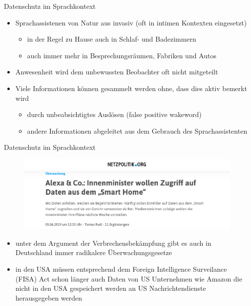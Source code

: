 \documentclass[aspectratio=169]{beamer}
\begin{document}
\begin{frame}{Datenschutz im Sprachkontext}
	\begin{itemize} 
		\item Sprachassistenen von Natur aus invasiv (oft in intimen Kontexten eingesetzt)
		\begin{itemize} 
			\item in der Regel zu Hause auch in Schlaf- und Badezimmern
			\item auch immer mehr in Besprechungsräumen, Fabriken und Autos
		\end{itemize}
	    \item Anwesenheit wird dem unbewussten Beobachter oft nicht mitgeteilt
	    \item Viele Informationen können gesammelt werden ohne, dass dies aktiv bemerkt wird
	    \begin{itemize} 
	    	\item durch unbeabsichtigtes Auslösen (false positive wakeword)
	    	\item andere Informationen abgeleitet aus dem Gebrauch des Sprachassistenten
	    \end{itemize}
	\end{itemize}
\end{frame}

\begin{frame}{Datenschutz im Sprachkontext}
	\begin{figure}
		\includegraphics[scale=0.3]{images/alexa-police-access}
	\end{figure}
	\begin{itemize} 
		\item unter dem Argument der Verbrechensbekämpfung gibt es auch in Deutschland immer radikalere Überwachungsgesetze
		\item in den USA müssen entsprechend dem Foreign Intelligence Surveilance (FISA) Act schon länger auch Daten von US Unternehmen wie Amazon die nicht in den USA gespeichert werden an US Nachrichtendienste herausgegeben werden
    \end{itemize}
\end{frame}
\end{document}
